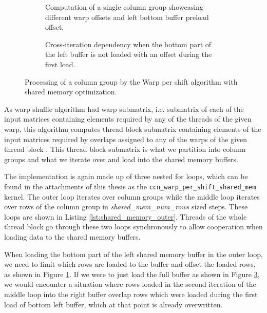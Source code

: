 \begin{figure}[ht]
	\centering	
	\begin{subfigure}{\textwidth}
		\centering
		\def\svgwidth{0.61\textwidth}
		\fontsize{8}{10}\selectfont
		
		\caption{Computation of a single column group showcasing different warp offsets and left bottom buffer preload offset.}
		\label{fig:shared_mem_buffer_iterations}
	\end{subfigure}

	\begin{subfigure}{\textwidth}
		\centering
		\def\svgwidth{0.61\textwidth}
		\fontsize{8}{10}\selectfont
		
		\caption{Cross-iteration dependency when the bottom part of the left buffer is not loaded with an offset during the first load.}
		\label{fig:left_buffer_no_preload}
	\end{subfigure}
	
	\caption{Processing of a column group by the Warp per shift algorithm with shared memory optimization.}
\end{figure}

As warp shuffle algorithm had warp submatrix, i.e. submatrix of each of the input matrices containing elements required by any of the threads of the given warp, this algorithm computes thread block submatrix containing elements of the input matrices required by overlaps assigned to any of the warps of the given thread block . This thread block submatrix is what we partition into column groups and what we iterate over and load into the shared memory buffers.

The implementation is again made up of three nested for loops, which can be found in the attachments of this thesis as the \texttt{ccn\_warp\_per\_shift\_shared\_mem} kernel. The outer loop iterates over column groups while the middle loop iterates over rows of the column group in \textit{shared\_mem\_num\_rows} sized steps. These loops are shown in Listing \ref{lst:shared_memory_outer}. Threads of the whole thread block go through these two loops synchronously to allow cooperation when loading data to the shared memory buffers. 

When loading the bottom part of the left shared memory buffer in the outer loop, we need to limit which rows are loaded to the buffer and offset the loaded rows, as shown in Figure \ref{fig:shared_mem_buffer_iterations}. If we were to just load the full buffer as shown in Figure \ref{fig:left_buffer_no_preload}, we would encounter a situation where rows loaded in the second iteration of the middle loop into the right buffer overlap rows which were loaded during the first load of bottom left buffer, which at that point is already overwritten.  

